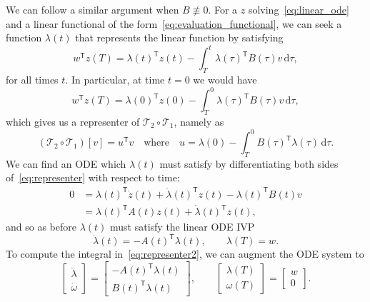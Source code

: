 \documentclass{article}
\begin{document}
We can follow a similar argument when $B \not \equiv 0$. For a $z$
solving~\eqref{eq:linear_ode} and a linear functional of the
form~\eqref{eq:evaluation_functional}, we can seek a function $\lambda(t)$
that represents the linear function by satisfying
\begin{equation}
    w^\mathsf{T} z(T) = \lambda(t)^\mathsf{T} z(t) - \int_T^t \lambda(\tau)^\mathsf{T} B(\tau) v \, \mathrm{d} \tau,
    \label{eq:representer}
\end{equation}
for all times $t$. In particular, at time $t=0$ we would have
\begin{equation}
    w^\mathsf{T} z(T) = \lambda(0)^\mathsf{T} z(0) - \int_T^0 \lambda(\tau)^\mathsf{T} B(\tau) v \, \mathrm{d} \tau,
\end{equation}
which gives us a representer of $\mathcal{T}_2 \circ \mathcal{T}_1$, namely as
\begin{equation}
    (\mathcal{T}_2 \circ \mathcal{T}_1)[v] = u^\mathsf{T} v
    \quad \text{where} \quad
    u = \lambda(0) - \int_T^0 B(\tau)^\mathsf{T} \lambda(\tau) \, \mathrm{d} \tau.
    \label{eq:representer2}
\end{equation}
We can find an ODE which $\lambda(t)$ must satisfy by
differentiating both sides of~\eqref{eq:representer} with respect to time:
\begin{align}
    0 &= \lambda(t)^\mathsf{T} \dot z(t) + \dot \lambda(t)^\mathsf{T} z(t) - \lambda(t)^\mathsf{T} B(t) v
    \\
    &= \lambda(t)^\mathsf{T} A(t) z(t) + \dot \lambda(t)^\mathsf{T} z(t),
\end{align}
and so as before $\lambda(t)$ must satisfy the linear ODE IVP
\begin{equation}
    \dot \lambda(t) = -A(t)^\mathsf{T} \lambda(t), \qquad \lambda(T) = w.
\end{equation}
To compute the integral in~\eqref{eq:representer2}, we can augment the ODE
system to
\begin{equation}
    \begin{bmatrix}
        \dot \lambda \\
        \dot \omega
    \end{bmatrix}
    =
    \begin{bmatrix}
        - A(t)^\mathsf{T} \lambda(t)
        \\
        B(t)^\mathsf{T} \lambda(t)
    \end{bmatrix},
    \qquad
    \begin{bmatrix}
        \lambda(T) \\
        \omega(T)
    \end{bmatrix}
    =
    \begin{bmatrix}
        w \\
        0
    \end{bmatrix}.
\end{equation}
\end{document}
